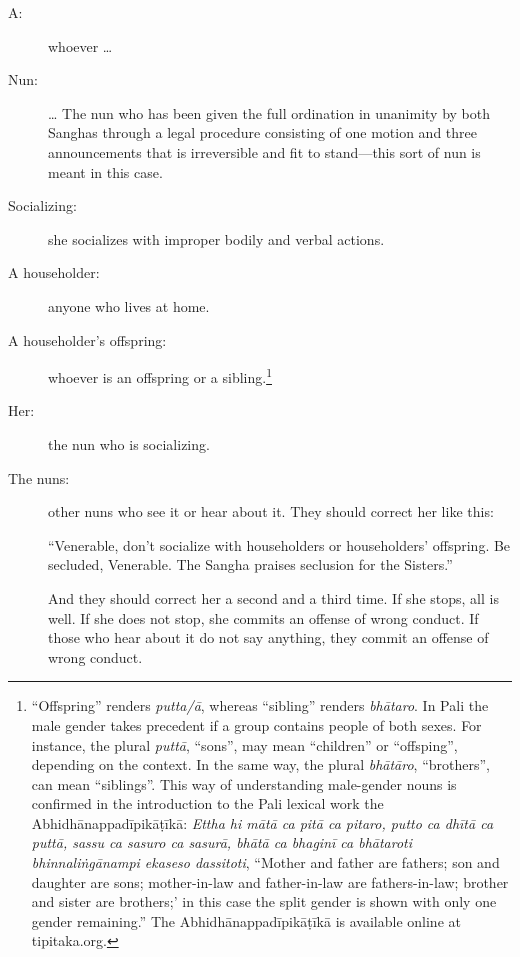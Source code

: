 \documentclass[12pt,openany]{book}%
\begin{document}
\begin{description}%
\item[A: ] whoever … %
\item[Nun: ] … The nun who has been given the full ordination in unanimity by both Sanghas through a legal procedure consisting of one motion and three announcements that is irreversible and fit to stand—this sort of nun is meant in this case. %
\item[Socializing: ] she socializes with improper bodily and verbal actions. %
\item[A householder: ] anyone who lives at home. %
\item[A householder’s offspring: ] whoever is an offspring or a sibling.\footnote{“Offspring” renders \textit{putta/\textsanskrit{ā}}, whereas “sibling” renders \textit{\textsanskrit{bhātaro}}. In Pali the male gender takes precedent if a group contains people of both sexes. For instance, the plural \textit{\textsanskrit{puttā}}, “sons”, may mean “children” or “offsping”, depending on the context. In the same way, the plural \textit{\textsanskrit{bhātāro}}, “brothers”, can mean “siblings”. This way of understanding male-gender nouns is confirmed in the introduction to the Pali lexical work the \textsanskrit{Abhidhānappadīpikāṭīkā}: \textit{Ettha hi \textsanskrit{mātā} ca \textsanskrit{pitā} ca pitaro, putto ca \textsanskrit{dhītā} ca \textsanskrit{puttā}, sassu ca sasuro ca \textsanskrit{sasurā}, \textsanskrit{bhātā} ca \textsanskrit{bhaginī} ca \textsanskrit{bhātaroti} \textsanskrit{bhinnaliṅgānampi} ekaseso dassitoti}, “Mother and father are fathers; son and daughter are sons; mother-in-law and father-in-law are fathers-in-law; brother and sister are brothers;’ in this case the split gender is shown with only one gender remaining.” The \textsanskrit{Abhidhānappadīpikāṭīkā} is available online at tipitaka.org. } %
\item[Her: ] the nun who is socializing. %
\item[The nuns: ] other nuns who see it or hear about it. They should correct her like this: 

“Venerable, don’t socialize with householders or householders’ offspring. Be secluded, Venerable. The Sangha praises seclusion for the Sisters.” 

And they should correct her a second and a third time. If she stops, all is well. If she does not stop, she commits an offense of wrong conduct. If those who hear about it do not say anything, they commit an offense of wrong conduct. 


\end{description}
\end{document}
